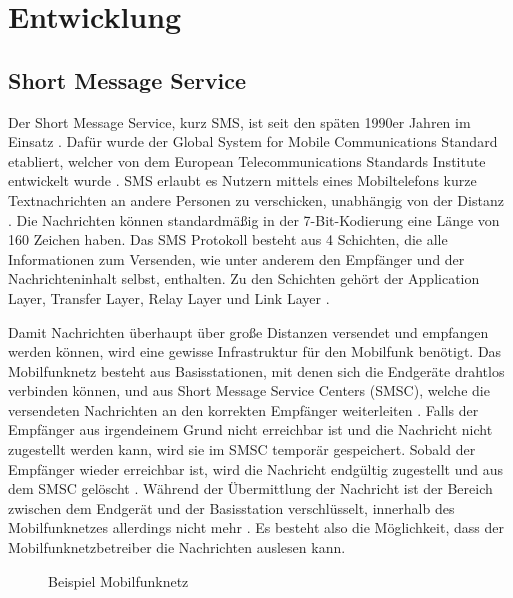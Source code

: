 \documentclass[conference]{IEEEtran}
\begin{document}
\section{Entwicklung}

\subsection{Short Message Service}

Der Short Message Service, kurz SMS, ist seit den späten 1990er Jahren im Einsatz \cite{sendoutsms}.
Dafür wurde der Global System for Mobile Communications Standard etabliert, welcher von dem European Telecommunications Standards Institute entwickelt wurde \cite{smshow}.
SMS erlaubt es Nutzern mittels eines Mobiltelefons kurze Textnachrichten an andere Personen zu verschicken, unabhängig von der Distanz \cite{sendoutsms}.
Die Nachrichten können standardmäßig in der 7-Bit-Kodierung eine Länge von 160 Zeichen haben.
Das SMS Protokoll besteht aus 4 Schichten, die alle Informationen zum Versenden, wie unter anderem den Empfänger und der Nachrichteninhalt selbst, enthalten.
Zu den Schichten gehört der Application Layer, Transfer Layer, Relay Layer und Link Layer \cite{smshow}.

Damit Nachrichten überhaupt über große Distanzen versendet und empfangen werden können, wird eine gewisse Infrastruktur für den Mobilfunk benötigt.
Das Mobilfunknetz besteht aus Basisstationen, mit denen sich die Endgeräte drahtlos verbinden können, und aus Short Message Service Centers (SMSC), welche die versendeten Nachrichten an den korrekten Empfänger weiterleiten \cite{sendoutsms}.
Falls der Empfänger aus irgendeinem Grund nicht erreichbar ist und die Nachricht nicht zugestellt werden kann, wird sie im SMSC temporär gespeichert. Sobald der Empfänger wieder erreichbar ist, wird die Nachricht endgültig zugestellt und aus dem SMSC gelöscht \cite{smshow}.
Während der Übermittlung der Nachricht ist der Bereich zwischen dem Endgerät und der Basisstation verschlüsselt, innerhalb des Mobilfunknetzes allerdings nicht mehr \cite{sendoutsms}. Es besteht also die Möglichkeit, dass der Mobilfunknetzbetreiber die Nachrichten auslesen kann.

\begin{figure}
    \centerline{}
    \caption{Beispiel Mobilfunknetz}
\end{figure}
\end{document}
